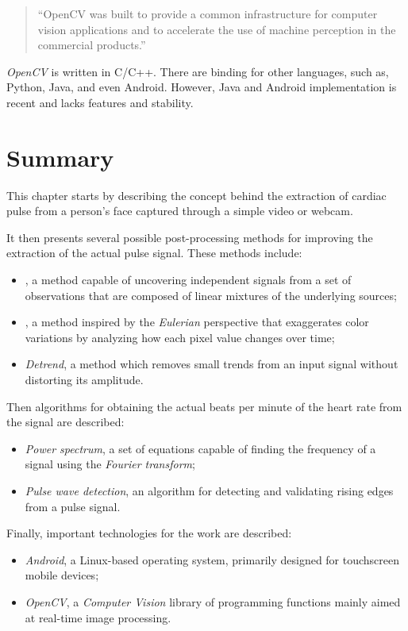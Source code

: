 \begin{quote}
  ``OpenCV was built to provide a common infrastructure for computer
  vision applications and to accelerate the use of machine perception
  in the commercial products.''~\cite{Opencv2013About}
\end{quote}

\emph{OpenCV} is written in C/C++. There are binding for other languages,
such as, Python, Java, and even Android. However, Java and Android
implementation is recent and lacks features and stability.

\section{Summary}

This chapter starts by describing the concept behind the extraction of
cardiac pulse from a person's face captured through a simple video
or webcam.

It then presents several possible post-processing methods for improving
the extraction of the actual pulse signal. These methods include:
\begin{itemize}
  \item \emph{\ica}, a method capable of uncovering independent signals from
        a set of observations that are composed of linear mixtures of the
        underlying sources;
  \item \emph{\evm}, a method inspired by the \emph{Eulerian} perspective that
        exaggerates color variations by analyzing how each pixel value
        changes over time;
  \item \emph{Detrend}, a method which removes small trends from an input
        signal without distorting its amplitude.
\end{itemize}

Then algorithms for obtaining the actual beats per minute of the heart rate
from the signal are described:
\begin{itemize}
  \item \emph{Power spectrum}, a set of equations capable of finding the
        frequency of a signal using the \emph{Fourier transform};
  \item \emph{Pulse wave detection}, an algorithm for detecting and validating
        rising edges from a pulse signal.
\end{itemize}

Finally, important technologies for the work are described:
\begin{itemize}
  \item \emph{Android}, a Linux-based operating system, primarily designed for
        touchscreen mobile devices;
  \item \emph{OpenCV}, a \emph{Computer Vision} library of programming
        functions mainly aimed at real-time image processing.
\end{itemize}
